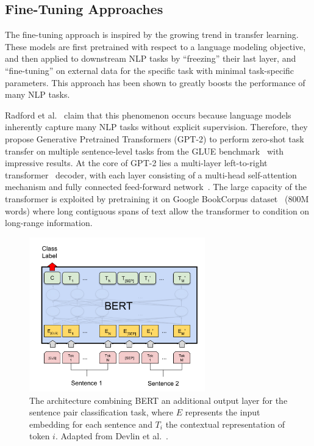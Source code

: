 \subsection{Fine-Tuning Approaches}

The fine-tuning approach is inspired by the growing trend in transfer learning.
These models are first pretrained with respect to a language modeling objective, and then applied to downstream NLP tasks by ``freezing'' their last layer, and ``fine-tuning'' on external data for the specific task with minimal task-specific parameters.
This approach has been shown to greatly boosts the performance of many NLP tasks.

Radford et al.~\cite{radford2019language} claim that this phenomenon occurs because language models inherently capture many NLP tasks without explicit supervision.
Therefore, they propose Generative Pretrained Transformers (GPT-2) to perform zero-shot task transfer on multiple sentence-level tasks from the GLUE benchmark~\cite{wang2018glue} with impressive results.
At the core of GPT-2 lies a multi-layer left-to-right transformer~\cite{vaswani2017attention} decoder, with each layer consisting of a multi-head self-attention mechanism and fully connected feed-forward network~\cite{radford2018improving}.
The large capacity of the transformer is exploited by pretraining it on Google BookCorpus dataset~\cite{zhu2015aligning} (800M words) where long contiguous spans of text allow the transformer to condition on long-range information.

\begin{figure}[b!]
\centering
  \includegraphics[width=3in]{bert.png}
\caption{The architecture combining BERT an additional output layer for the sentence pair classification task, where $ E $ represents the input embedding for each sentence and $ T_i $ the contextual representation of token $ i $. Adapted from Devlin et al.~\cite{devlin2018bert}.}
\label{fig:bert}
\end{figure}

